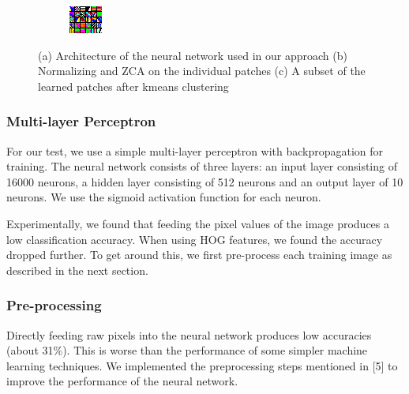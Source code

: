 \documentclass{article} %
\begin{document}
\begin{figure}
\begin{subfigure}{.2\linewidth}
            \includegraphics[width=\linewidth]{images/patch-clusters-few.png}
        \caption{}
        \end{subfigure}
        \caption{(a) Architecture of the neural network used in our approach (b) Normalizing and ZCA on the individual patches (c) A subset of the learned patches after kmeans clustering}
    \end{figure}
 

    \subsubsection{Multi-layer Perceptron} %
    \label{sub:Multi-layer Perceptron}
        For our test, we use a simple multi-layer perceptron with backpropagation for training. The neural network consists of three layers: an input layer consisting of 16000 neurons, a hidden layer consisting of 512 neurons and an output layer of 10 neurons. We use the sigmoid activation function for each neuron.

        Experimentally, we found that feeding the pixel values of the image produces a low classification accuracy. When using HOG features, we found the accuracy dropped further. To get around this, we first pre-process each training image as described in the next section.

    \subsubsection{Pre-processing} %
    \label{sub:Pre-processing}
        Directly feeding raw pixels into the neural network produces low accuracies (about 31\%). This is worse than the performance of some simpler machine learning techniques. We implemented the preprocessing steps mentioned in [5] to improve the performance of the neural network. 
\end{document}
